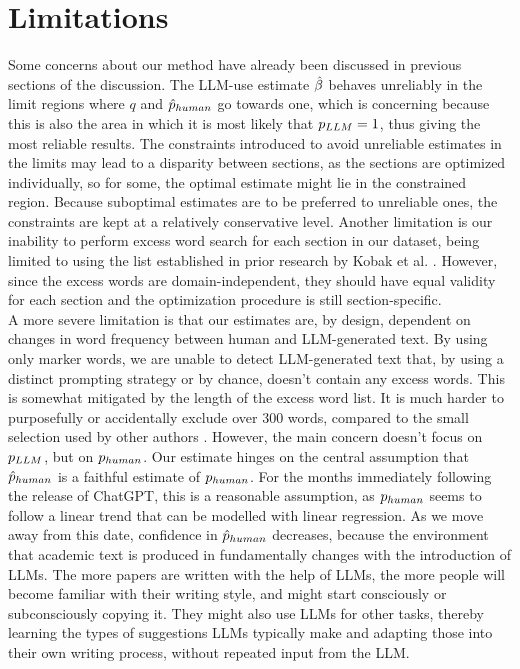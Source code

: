 \section{Limitations}
Some concerns about our method have already been discussed in previous sections of the discussion.
The LLM-use estimate $\hat{\beta}$ behaves unreliably in the limit regions where $q$ and $\hat{p}_{human}$ go towards one, which is concerning because this is also the area in which it is most likely that $p_{LLM}=1$, thus giving the most reliable results.
The constraints introduced to avoid unreliable estimates in the limits may lead to a disparity between sections, as the sections are optimized individually, so for some, the optimal estimate might lie in the constrained region. 
Because suboptimal estimates are to be preferred to unreliable ones, the constraints are kept at a relatively conservative level. 
Another limitation is our inability to perform excess word search for each section in our dataset, being limited to using the list established in prior research by Kobak et al. \cite{Kobak2025}.
However, since the excess words are domain-independent, they should have equal validity for each section and the optimization procedure is still section-specific.
\\
A more severe limitation is that our estimates are, by design, dependent on changes in word frequency between human and LLM-generated text.
By using only marker words, we are unable to detect LLM-generated text that, by using a distinct prompting strategy \cite{Geng2025} or by chance, doesn't contain any excess words.
This is somewhat mitigated by the length of the excess word list.
It is much harder to purposefully or accidentally exclude over 300 words, compared to the small selection used by other authors \cite{Gray2025, Gray2026, Kousha2025}.
However, the main concern doesn't focus on $p_{LLM}$, but on $p_{human}$.
Our estimate hinges on the central assumption that $\hat{p}_{human}$ is a faithful estimate of $p_{human}$. 
For the months immediately following the release of ChatGPT, this is a reasonable assumption, as $p_{human}$ seems to follow a linear trend that can be modelled with linear regression.
As we move away from this date, confidence in $\hat{p}_{human}$ decreases, because the environment that academic text is produced in fundamentally changes with the introduction of LLMs.
The more papers are written with the help of LLMs, the more people will become familiar with their writing style, and might start consciously or subconsciously copying it.
They might also use LLMs for other tasks, thereby learning the types of suggestions LLMs typically make and adapting those into their own writing process, without repeated input from the LLM.
